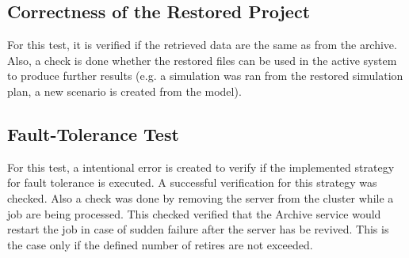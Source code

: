 \subsection{Correctness of the Restored Project}
For this test, it is verified if the retrieved data are the same as from the archive. Also, a check is done whether the restored files can be used in the active system
to produce further results (e.g. a simulation was ran from the restored simulation plan, a new scenario is created from the model).

\subsection{Fault-Tolerance Test}
For this test, a intentional error is created to verify if the implemented strategy for fault tolerance is executed. A successful verification for this
strategy was checked. Also a check was done by removing the server from the cluster while a job are being processed. This checked verified that the Archive service
would restart the job in case of sudden failure after the server has be revived. This is the case only if the defined number of retires are not exceeded.